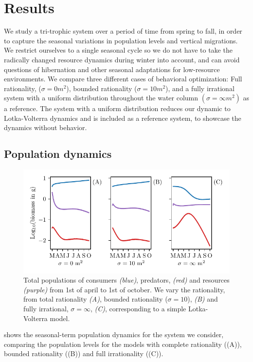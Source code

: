 \section{Results}
We study a tri-trophic system over a period of time from spring to fall, in order to capture the seasonal variations in population levels and vertical migrations. We restrict ourselves to a single seasonal cycle so we do not have to take the radically changed resource dynamics during winter into account, and can avoid questions of hibernation and other seasonal adaptations for low-resource environments. We compare three different cases of behavioral optimization: Full rationality, ($\sigma = 0 m^2$), bounded rationality ($\sigma = 10 m^2$), and a fully irrational system with a uniform distribution throughout the water column $(\sigma = \infty m^2)$ as a reference. The system with a uniform distribution reduces our dynamic to Lotka-Volterra dynamics and is included as a reference system, to showcase the dynamics without behavior.

\subsection*{Population dynamics}
\begin{figure}[H]
\includegraphics{plots/populations.pdf}
\caption{Total populations of consumers \emph{(blue)}, predators, \emph{(red)} and resources \emph{(purple)} from 1st of april to 1st of october. We vary the rationality, from total rationality \emph{(A)}, bounded rationality ($\sigma = 10$), \emph{(B)} and fully irrational, $\sigma = \infty$, \emph{(C)}, corresponding to a simple Lotka-Volterra model.}
\label{fig:long_term_populations}
\end{figure}
 shows the seasonal-term population dynamics for the system we consider, comparing the population levels for the models with complete rationality ((A)), bounded rationality ((B)) and full irrationality ((C)).

